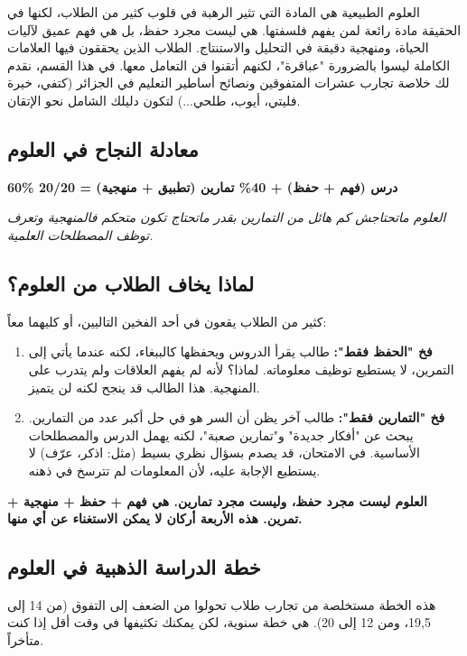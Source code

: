 \documentclass[12pt,a4paper]{book}
\newcommand{\quoteAr}[1]{%
	\begin{myquote}
		\itshape #1
	\end{myquote}
}
\newcommand{\importantAr}[1]{%
	\begin{important}
		\bfseries #1
	\end{important}
}
\begin{document}
	العلوم الطبيعية هي المادة التي تثير الرهبة في قلوب كثير من الطلاب، لكنها في الحقيقة مادة رائعة لمن يفهم فلسفتها. هي ليست مجرد حفظ، بل هي فهم عميق لآليات الحياة، ومنهجية دقيقة في التحليل والاستنتاج. الطلاب الذين يحققون فيها العلامات الكاملة ليسوا بالضرورة "عباقرة"، لكنهم أتقنوا فن التعامل معها. في هذا القسم، نقدم لك خلاصة تجارب عشرات المتفوقين ونصائح أساطير التعليم في الجزائر (كتفي، خيرة فليتي، أيوب، طلحي...) لتكون دليلك الشامل نحو الإتقان.
	
	\subsection{معادلة النجاح في العلوم}
	\begin{center}
		\Large
		\textbf{60\% درس (فهم + حفظ) + 40\% تمارين (تطبيق + منهجية) = 20/20}
	\end{center}
	
	\quoteAr{العلوم ماتحتاجش كم هائل من التمارين بقدر ماتحتاج تكون متحكم فالمنهجية وتعرف توظف المصطلحات العلمية.}
	
	\subsection{لماذا يخاف الطلاب من العلوم؟ }
	كثير من الطلاب يقعون في أحد الفخين التاليين، أو كليهما معاً:
	
	\begin{enumerate}
		\item \textbf{فخ "الحفظ فقط":} طالب يقرأ الدروس ويحفظها كالببغاء، لكنه عندما يأتي إلى التمرين، لا يستطيع توظيف معلوماته. لماذا؟ لأنه لم يفهم العلاقات ولم يتدرب على المنهجية. هذا الطالب قد ينجح لكنه لن يتميز.
		\item \textbf{فخ "التمارين فقط":} طالب آخر يظن أن السر هو في حل أكبر عدد من التمارين. يبحث عن "أفكار جديدة" و"تمارين صعبة"، لكنه يهمل الدرس والمصطلحات الأساسية. في الامتحان، قد يصدم بسؤال نظري بسيط (مثل: اذكر، عرّف) لا يستطيع الإجابة عليه، لأن المعلومات لم تترسخ في ذهنه.
	\end{enumerate}
	
	\importantAr{العلوم ليست مجرد حفظ، وليست مجرد تمارين. هي \textbf{فهم + حفظ + منهجية + تمرين}. هذه الأربعة أركان لا يمكن الاستغناء عن أي منها.}
	
	\subsection{خطة الدراسة الذهبية في العلوم}
	هذه الخطة مستخلصة من تجارب طلاب تحولوا من الضعف إلى التفوق (من 14 إلى 19,5، ومن 12 إلى 20). هي خطة سنوية، لكن يمكنك تكثيفها في وقت أقل إذا كنت متأخراً.
	
\end{document}
